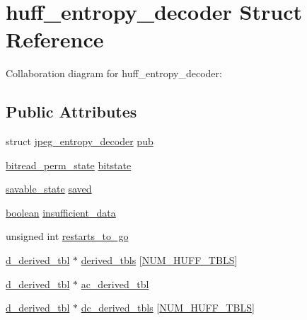\hypertarget{structhuff__entropy__decoder}{}\section{huff\+\_\+entropy\+\_\+decoder Struct Reference}
\label{structhuff__entropy__decoder}


Collaboration diagram for huff\+\_\+entropy\+\_\+decoder\+:
\subsection*{Public Attributes}
\begin{DoxyCompactItemize}
\item 
struct \hyperlink{structjpeg__entropy__decoder}{jpeg\+\_\+entropy\+\_\+decoder} \hyperlink{structhuff__entropy__decoder_a85f304c89441e96be66e49685cf24c3d}{pub}
\item 
\hyperlink{structbitread__perm__state}{bitread\+\_\+perm\+\_\+state} \hyperlink{structhuff__entropy__decoder_a06e5f8944ccb6057c6f72b3df2441223}{bitstate}
\item 
\hyperlink{structsavable__state}{savable\+\_\+state} \hyperlink{structhuff__entropy__decoder_a0e0efb55a8a5b01e1e49aa9c3fb8dfe6}{saved}
\item 
\hyperlink{jmorecfg_8h_a7c6368b321bd9acd0149b030bb8275ed}{boolean} \hyperlink{structhuff__entropy__decoder_a412a9c88d74ed51774d25757b602b7ae}{insufficient\+\_\+data}
\item 
unsigned int \hyperlink{structhuff__entropy__decoder_af6005b639dada949c62767bed24daa1a}{restarts\+\_\+to\+\_\+go}
\item 
\hyperlink{structd__derived__tbl}{d\+\_\+derived\+\_\+tbl} $\ast$ \hyperlink{structhuff__entropy__decoder_a615d2735aebeee55b9820f09700677be}{derived\+\_\+tbls} \mbox{[}\hyperlink{jpeglib_8h_a6b12985705944e0623b671f29dc5722e}{N\+U\+M\+\_\+\+H\+U\+F\+F\+\_\+\+T\+B\+L\+S}\mbox{]}
\item 
\hyperlink{structd__derived__tbl}{d\+\_\+derived\+\_\+tbl} $\ast$ \hyperlink{structhuff__entropy__decoder_adbbf18c6aa3065d9bcf6bf33079733e0}{ac\+\_\+derived\+\_\+tbl}
\item 
\hyperlink{structd__derived__tbl}{d\+\_\+derived\+\_\+tbl} $\ast$ \hyperlink{structhuff__entropy__decoder_a277328a6f93b55616bd86b0056098c65}{dc\+\_\+derived\+\_\+tbls} \mbox{[}\hyperlink{jpeglib_8h_a6b12985705944e0623b671f29dc5722e}{N\+U\+M\+\_\+\+H\+U\+F\+F\+\_\+\+T\+B\+L\+S}\mbox{]}
\item 

\end{DoxyCompactItemize}
